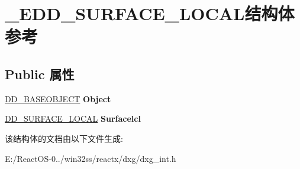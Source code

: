 \hypertarget{struct___e_d_d___s_u_r_f_a_c_e___l_o_c_a_l}{}\section{\+\_\+\+E\+D\+D\+\_\+\+S\+U\+R\+F\+A\+C\+E\+\_\+\+L\+O\+C\+A\+L结构体 参考}
\label{struct___e_d_d___s_u_r_f_a_c_e___l_o_c_a_l}
\subsection*{Public 属性}
\begin{DoxyCompactItemize}
\item 
\mbox{\label{struct___e_d_d___s_u_r_f_a_c_e___l_o_c_a_l_aebbe142b6c6fcbd84efecc7ecfbe125f}} 
\hyperlink{struct___d_d___b_a_s_e_o_b_j_e_c_t}{D\+D\+\_\+\+B\+A\+S\+E\+O\+B\+J\+E\+CT} {\bfseries Object}
\item 
\mbox{\label{struct___e_d_d___s_u_r_f_a_c_e___l_o_c_a_l_a7abb1e638299fa827e7de1067023740c}} 
\hyperlink{struct___d_d___s_u_r_f_a_c_e___l_o_c_a_l}{D\+D\+\_\+\+S\+U\+R\+F\+A\+C\+E\+\_\+\+L\+O\+C\+AL} {\bfseries Surfacelcl}
\end{DoxyCompactItemize}


该结构体的文档由以下文件生成\+:\begin{DoxyCompactItemize}
\item 
E\+:/\+React\+O\+S-\/0../win32ss/reactx/dxg/dxg\+\_\+int.\+h\end{DoxyCompactItemize}

